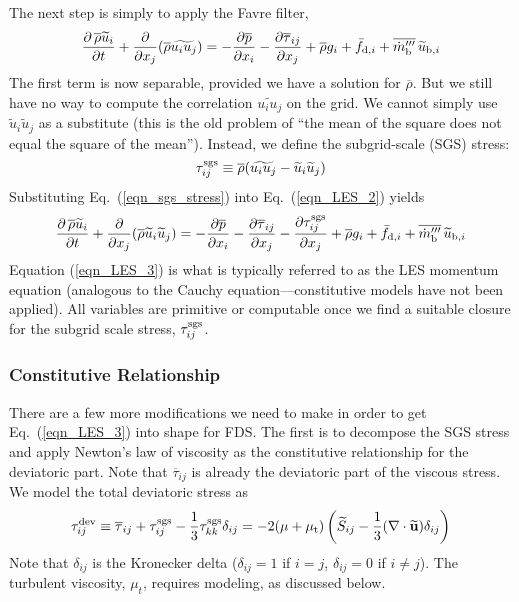 The next step is simply to apply the Favre filter,
\begin{equation}
\label{eqn_LES_2}
\frac{\partial \,\overline{\rho} \widetilde{u}_i}{\partial t} + \frac{\partial}{\partial x_j} (\overline{\rho} \widetilde{u_i u_j}) = -\frac{\partial \overline{p}}{\partial x_i} - \frac{\partial \overline{\tau}_{ij}}{\partial x_j} + \overline{\rho} g_i + \bar{f}_{{\rm d},i} + \overline{\dot{m}_{\rm b}^{\prime\prime\prime}} \, \widetilde{u}_{{\rm b},i}
\end{equation}
The first term is now separable, provided we have a solution for $\overline{\rho}$. But we still have no way to compute the correlation $\widetilde{u_i u_j}$ on the grid. We cannot simply use $\widetilde{u}_i \widetilde{u}_j$ as a substitute (this is the old problem of ``the mean of the square does not equal the square of the mean''). Instead, we define the subgrid-scale (SGS) stress:
\begin{equation}
\label{eqn_sgs_stress}
\tau_{ij}^{\rm sgs} \equiv \overline{\rho} ( \widetilde{u_i u_j} - \widetilde{u}_i \widetilde{u}_j )
\end{equation}
Substituting Eq.~(\ref{eqn_sgs_stress}) into Eq.~(\ref{eqn_LES_2}) yields
\begin{equation}
\label{eqn_LES_3}
\frac{\partial \,\overline{\rho} \widetilde{u}_i}{\partial t} + \frac{\partial}{\partial x_j} (\overline{\rho} \widetilde{u}_i \widetilde{u}_j) = -\frac{\partial \overline{p}}{\partial x_i} - \frac{\partial \overline{\tau}_{ij}}{\partial x_j} - \frac{\partial \tau_{ij}^{\rm sgs}}{\partial x_j} + \overline{\rho} g_i + \bar{f}_{{\rm d},i} + \overline{\dot{m}_{\rm b}^{\prime\prime\prime}} \, \widetilde{u}_{{\rm b},i}
\end{equation}
Equation (\ref{eqn_LES_3}) is what is typically referred to as the LES momentum equation (analogous to the Cauchy equation---constitutive models have not been applied).  All variables are primitive or computable once we find a suitable closure for the subgrid scale stress, $\tau_{ij}^{\rm sgs}$.

\subsubsection*{Constitutive Relationship}

There are a few more modifications we need to make in order to get Eq.~(\ref{eqn_LES_3}) into shape for FDS.  The first is to decompose the SGS stress and apply Newton's law of viscosity as the constitutive relationship for the deviatoric part.  Note that $\overline{\tau}_{ij}$ is already the deviatoric part of the viscous stress.  We model the total deviatoric stress as
\begin{equation}
\label{eqn_newtons_law_sgs}
\tau_{ij}^{\rm dev} \equiv \overline{\tau}_{ij} + \tau_{ij}^{\rm sgs} - \frac{1}{3}\tau_{kk}^{\rm sgs}\delta_{ij} = - 2 (\mu + \mu_{\rm t}) \left(\widetilde{S}_{ij} - \frac{1}{3}(\nabla\cdot \widetilde{\mathbf{u}}) \delta_{ij} \right)
\end{equation}
Note that $\delta_{ij}$ is the Kronecker delta ($\delta_{ij}=1$ if $i=j$, $\delta_{ij}=0$ if $i\ne j$).  The turbulent viscosity, $\mu_t$, requires modeling, as discussed below.

